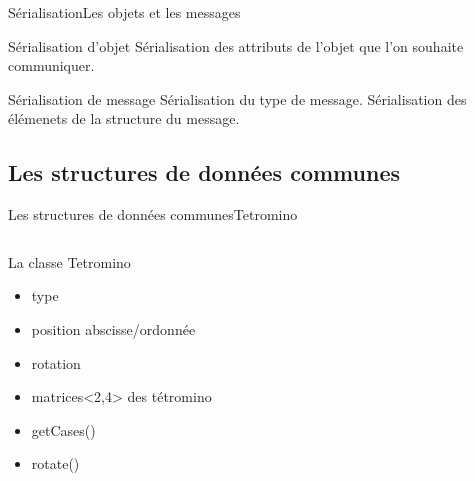 \documentclass[french]{beamer}
\begin{document}
	    \begin{frame}[fragile]{Sérialisation}{Les objets et les messages}
	        \begin{block}{Sérialisation d'objet}
	            Sérialisation des attributs de l'objet que l'on souhaite communiquer.
	        \end{block}

	        \begin{block}{Sérialisation de message}
	            Sérialisation du type de message.
	            \newline
	            Sérialisation des élémenets de la structure du message.
	        \end{block}
	    \end{frame}



	\subsection{Les structures de données communes}

			\begin{frame}{Les structures de données communes}{Tetromino}	

				\begin{columns}
					\begin{column}{0.45\textwidth}
						\begin{block}{La classe Tetromino}
							\begin{itemize}
								\item type
								\item position abscisse/ordonnée
								\item rotation
								\item matrices<2,4> des tétromino
								\item getCases()
								\item rotate()
							\end{itemize}
						\end{block}
					\end{column}
					\begin{column}{0.35\textwidth}

					\end{column}
				\end{columns}
				
			\end{frame}
\end{document}
